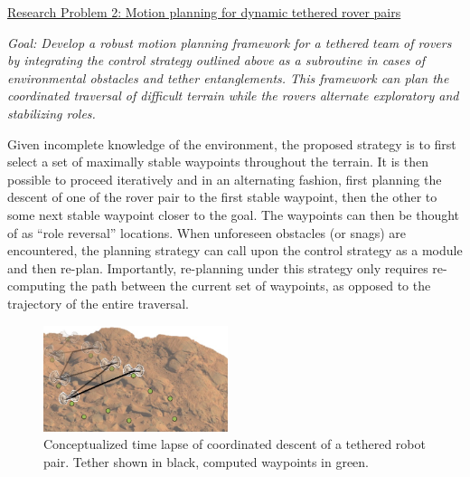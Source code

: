 \documentclass[12pt]{article}
\begin{document}

\noindent\underline{Research Problem 2: Motion planning for dynamic
  tethered rover pairs }

{\sl Goal: Develop a robust motion planning framework for a tethered
  team of rovers by integrating the control strategy outlined above as
  a subroutine in cases of environmental obstacles and tether
  entanglements. This framework can plan the coordinated traversal of
  difficult terrain while the rovers alternate exploratory and
  stabilizing roles. }


Given incomplete knowledge of the environment, the proposed strategy
is to first select a set of maximally stable waypoints throughout the
terrain. It is then possible to proceed iteratively and in an
alternating fashion, first planning the descent of one of the rover
pair to the first stable waypoint, then the other to some next stable
waypoint closer to the goal. The waypoints can then be thought of as
``role reversal'' locations. When unforeseen obstacles (or snags) are
encountered, the planning strategy can call upon the control strategy
as a module and then re-plan.  Importantly, re-planning under this
strategy only requires re-computing the path between the current set
of waypoints, as opposed to the trajectory of the entire traversal.

\begin{figure}
  \begin{center}
  \vspace{-0.4in} 
  \includegraphics[width=0.48\textwidth, left]{descent_2.png}
  \end{center}
  \vspace{-0.2in}
  \label{fig:descent}
  \caption{Conceptualized time lapse of coordinated descent of a tethered robot pair. Tether shown in black, computed 
  waypoints in green.} \vspace{-.2in}
\end{figure}
\end{document}
